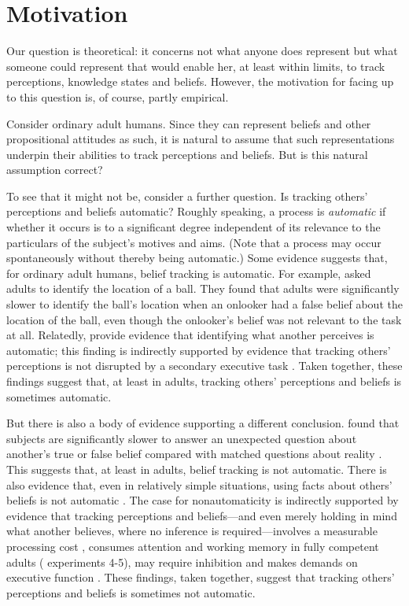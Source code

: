 \documentclass[12pt,\papersize]{extarticle}
\begin{document}
\section{Motivation}
\label{sec:motivation}
Our question is theoretical: it concerns 
not what anyone does represent
but what someone could represent that would enable her, at least within limits, to track perceptions, knowledge states and beliefs.
However, the motivation for facing up to this question is, of course, partly empirical.

Consider ordinary adult humans.
Since they can represent beliefs and other propositional attitudes as such, 
it is natural to assume that such representations underpin their abilities to track perceptions and beliefs.
But is this natural assumption correct?

To see that it might not be, consider a further question.
Is tracking others' perceptions and beliefs automatic?
Roughly speaking,
a process is \emph{automatic} if whether it occurs is to a significant degree independent of its relevance to the particulars of the subject's motives and aims.
(Note that a process may occur spontaneously without thereby being automatic.)  
Some evidence suggests that, for ordinary adult humans, belief tracking is automatic.
For example,
\citet{kovacs_social_2010} asked adults to identify the location of a ball.
They found that adults were significantly slower to identify the ball's location when an onlooker had a false belief about the location of the ball,
even though the onlooker's belief was not relevant to the task at all.
Relatedly, \citet{Samson:2010jm} provide evidence that identifying what another perceives is automatic;  this finding is indirectly supported by  evidence that tracking others' perceptions is not disrupted by a secondary executive task \citep{qureshi:2010_executive}.
Taken together, these findings suggest that, at least in adults, tracking others' perceptions and beliefs is sometimes automatic.

But there is also a body of evidence supporting a different conclusion.
\citet{back:2010_apperly} found that subjects are significantly slower to answer an unexpected question about another's true or false belief compared with matched questions about reality \citep[see also][]{apperly:2006_belief}.
This suggests that, at least in adults, belief tracking is not automatic.
There is also evidence that, even in relatively simple situations, 
using facts about others' beliefs is not automatic \citep{Keysar:2003xu,apperly:2010_limits}.
The case for nonautomaticity is indirectly supported by evidence that tracking perceptions and beliefs---and even merely holding in mind what another believes, where no inference is required---involves a measurable processing cost  \citep{apperly:2008_back,apperly:2010_limits}, consumes attention and working memory in fully competent adults (\citealp{Apperly:2009cc, lin:2010_reflexively, McKinnon:2007rr} experiments 4-5), may require inhibition \citep{bull:2008_role} and makes demands on executive function \citep{apperly:2004_frontal,samson:2005_seeing}.
These findings, taken together, suggest that tracking others' perceptions and beliefs is sometimes not automatic.
\end{document}
